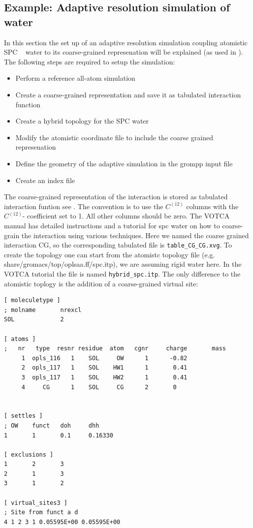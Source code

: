 \subsection{Example: Adaptive resolution simulation of water}\label{subsec:adressexample}
In this section the set up of  an adaptive resolution simulation coupling atomistic SPC ~\cite{Berendsen81} water to its coarse-grained represenation will be explained (as used in \cite{Fritsch2012b}).
The following steps are required to setup the simulation:
\begin{itemize}
\item Perform a reference all-atom simulation
\item Create a coarse-grained representation and save it as tabulated interaction function 
\item Create a hybrid topology for the SPC water
\item Modify the atomistic coordinate file to include the coarse grained represenation
\item Define the geometry of the adaptive simulation in the grompp input file
\item Create an index file
\end{itemize}
The coarse-grained representation of the interaction is stored as tabulated interaction funtion see . The convention is to use the $C^{(12)}$  columns with the  $C^{(12)}$- coefficient set to 1. All other columns should be zero. The VOTCA manual has detailed instructions and a tutorial for spc water on how to coarse-grain the interaction using various techniques. 
Here we named the coarse grained interaction CG, so the corresponding tabulated file is {\tt table_CG_CG.xvg}. To create the topology one can start from the atomistc topology file (e.g. share/gromacs/top/oplsaa.ff/spc.itp), we are assuming rigid water here. In the VOTCA tutorial the file is named {\tt hybrid_spc.itp}.
The only difference to the atomistic toplogy is the addition of a coarse-grained virtual site:
{\small
\begin{verbatim}
[ moleculetype ]
; molname       nrexcl
SOL             2

[ atoms ]
;   nr   type  resnr residue  atom   cgnr     charge       mass
     1  opls_116   1    SOL     OW      1      -0.82
     2  opls_117   1    SOL    HW1      1       0.41
     3  opls_117   1    SOL    HW2      1       0.41
     4     CG      1    SOL     CG      2       0


[ settles ]
; OW    funct   doh     dhh
1       1       0.1     0.16330

[ exclusions ]
1       2       3
2       1       3
3       1       2

[ virtual_sites3 ]
; Site from funct a d
4 1 2 3 1 0.05595E+00 0.05595E+00
\end{verbatim}}
